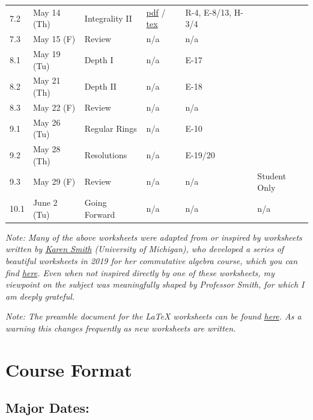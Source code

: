\documentclass[11pt,letterpaper]{article}
\newcommand{\pageheading}[1]{\section*{#1}\addcontentsline{toc}{section}{#1}}
\begin{document}
\begin{longtable}{L{25pt}L{69pt}L{106pt}L{65pt}L{136pt}L{55pt}}
7.2 & May 14 (Th) & Integrality II & \href{https://www.juliettebruce.xyz/teaching/121S26/7-2.pdf}{pdf} / \href{https://www.juliettebruce.xyz/teaching/121S26/7-2.tex}{tex} & R-4, E-8/13, H-3/4 &  \\
7.3 & May 15 (F) & Review & n/a & n/a &  \\
8.1 & May 19 (Tu) & Depth I & n/a & E-17 &  \\
8.2 & May 21 (Th) & Depth II & n/a & E-18 &  \\
8.3 & May 22 (F) & Review & n/a & n/a &  \\
9.1 & May 26 (Tu) & Regular Rings & n/a & E-10 &  \\
9.2 & May 28 (Th) & Resolutions & n/a & E-19/20 &  \\
9.3 & May 29 (F) & Review & n/a & n/a & Student Only \\
10.1 & June 2 (Tu) & Going Forward & n/a & n/a & n/a \\
\end{longtable}
\endgroup

\emph{Note: Many of the above worksheets were adapted from or inspired by worksheets written by \href{https://sites.lsa.umich.edu/kesmith/}{Karen Smith} (University of Michigan), who developed a series of beautiful worksheets in 2019 for her commutative algebra course, which you can find \href{https://sites.lsa.umich.edu/kesmith/teaching/math-614-commutative-algebra/}{here}. Even when not inspired directly by one of these worksheets, my viewpoint on the subject was meaningfully shaped by Professor Smith, for which I am deeply grateful.}

\emph{Note: The preamble document for the LaTeX worksheets can be found \href{https://www.juliettebruce.xyz/teaching/121S26/121preamble.text}{here}. As a warning this changes frequently as new worksheets are written.}

\clearpage
\begingroup
\fontsize{10.2}{13.1}\selectfont
\setlength{\parskip}{3pt plus 1pt}
\titlespacing*{\subsection}{0pt}{8pt}{2pt}
\pageheading{Course Format}

\subsection*{Major Dates:}
\end{document}
